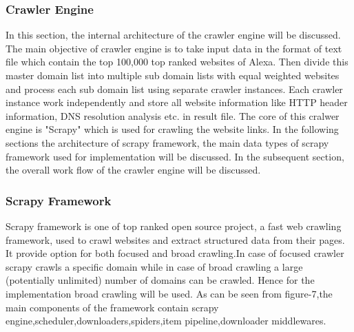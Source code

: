 \subsubsection{Crawler Engine}
In this section, the internal architecture of the crawler engine will be discussed. The main objective of crawler engine is to take input data in the format of text file which contain the top 100,000 top ranked websites of Alexa. Then divide this master domain list into multiple sub domain lists with equal weighted websites and process each sub domain list using separate crawler instances. Each crawler instance work independently and store all website information like HTTP header information, DNS resolution analysis etc. in result file. The core of this cralwer engine is "Scrapy" which is used for crawling the website links. In the following sections the architecture of scrapy framework, the main data types of scrapy framework used for implementation will be discussed. In the subsequent section, the overall work flow of the crawler engine will be discussed.
\subsubsection{Scrapy Framework}
Scrapy framework is one of top ranked open source project, a fast web crawling framework, used to crawl websites and extract structured data from their pages. It provide option for both focused and broad crawling.In case of focused crawler scrapy crawls a specific domain while in case of broad crawling a large (potentially unlimited) number of domains can be crawled. Hence for the implementation broad crawling will be used. As can be seen from figure-7,the main components of the framework contain scrapy engine,scheduler,downloaders,spiders,item pipeline,downloader middlewares.

